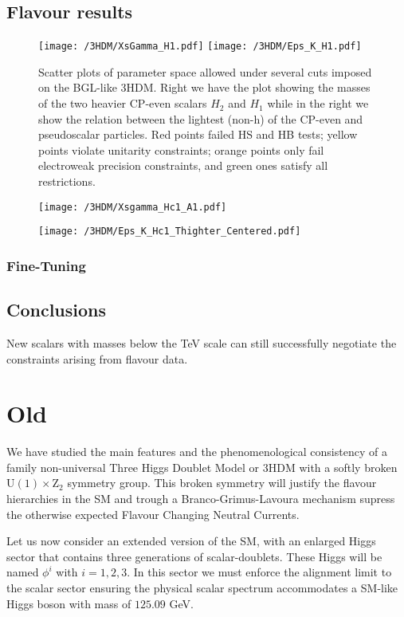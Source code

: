 \subsection{Flavour results}

\begin{figure}[H]
	\centering
	\texttt{[image: /3HDM/XsGamma\_H1.pdf]}
	\texttt{[image: /3HDM/Eps\_K\_H1.pdf]}
	\caption{Scatter plots of parameter space allowed under  several cuts imposed on the BGL-like 3HDM. Right we have the plot showing the masses of the two heavier CP-even scalars $H_2$ and $H_1$ while in the right we show the relation between the lightest
(non-h) of the CP-even and pseudoscalar particles. Red points failed HS and HB tests; yellow points violate unitarity constraints; orange points only fail electroweak precision constraints, and green ones satisfy all restrictions.}
	\label{fig:PT_plots_H1}
\end{figure}	


\begin{figure}[H]
	\centering
	\texttt{[image: /3HDM/Xsgamma\_Hc1\_A1.pdf]}
	\caption{}
	\label{fig:STU_2}
\end{figure}	

\begin{figure}[H]
	\centering
	\texttt{[image: /3HDM/Eps\_K\_Hc1\_Thighter\_Centered.pdf]}
	\caption{}
	\label{fig:STU_3}
\end{figure}	

\subsubsection{Fine-Tuning}


\subsection{Conclusions}
 
New scalars with masses below
the TeV scale can still successfully negotiate the constraints arising from flavour data.

\section{Old}

We have studied the main features and the phenomenological  consistency of a family non-universal Three Higgs Doublet Model or 3HDM with a softly broken $\mathrm{U(1)\times Z_2} $ symmetry group. This broken symmetry will justify the flavour hierarchies in the SM and trough a Branco-Grimus-Lavoura mechanism supress the otherwise expected Flavour Changing Neutral Currents. 

Let us now consider an extended version of the SM, with an enlarged Higgs sector that contains three generations of scalar-doublets. These Higgs will be named $\phi^i$ with $i={1,2,3}$.  In this sector we must enforce the alignment limit to the scalar sector ensuring the physical scalar spectrum accommodates a SM-like Higgs boson with mass of $125.09$ GeV.
